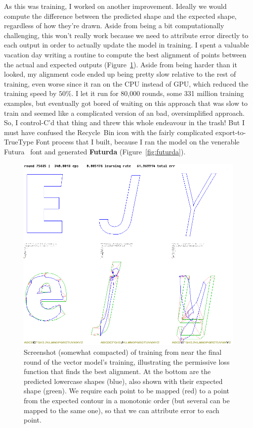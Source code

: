 \documentclass[twocolumn]{article}
\begin{document}
As this was training, I worked on another improvement. Ideally we
would compute the difference between the predicted shape and the
expected shape, regardless of how they're drawn. Aside from being a
bit computationally challenging, this won't really work because we
need to attribute error directly to each output in order to actually
update the model in training. I spent a valuable vacation day writing
a routine to compute the best alignment of points between the actual
and expected outputs (Figure~\ref{fig:trainingrotate}). Aside from being
harder than it looked, my alignment code ended up being pretty slow
relative to the rest of training, even worse since it ran on the CPU
instead of GPU, which reduced the training speed by $50\%$. I let it
run for 80,000 rounds, some 331 million training examples, but
eventually got bored of waiting on this approach that was slow to
train and seemed like a complicated version of an bad, oversimplified
approach. So, I control-C'd that thing and threw this whole endeavour
in the trash! But I must have confused the Recycle~Bin icon with the
fairly complicated export-to-TrueType Font process that I built,
because I ran the model on the venerable Futura~\cite{futura} font and
generated {\bf Futurda} (Figure~\ref{fig:futurda}).

\begin{figure}[ht]
\centering
  \includegraphics[width=0.95 \linewidth]{trainingrotate}
\caption{ Screenshot (somewhat compacted) of training from near the
  final round of the vector model's training, illustrating the
  permissive loss function that finds the best alignment. At the bottom are
  the predicted lowercase shapes (blue), also shown with their
  expected shape (green). We require each point to be mapped (red)
  to a point from the expected contour in a monotonic order (but
  several can be mapped to the same one), so that we can attribute
  error to each point.
} \label{fig:trainingrotate}
\end{figure}
\end{document}
